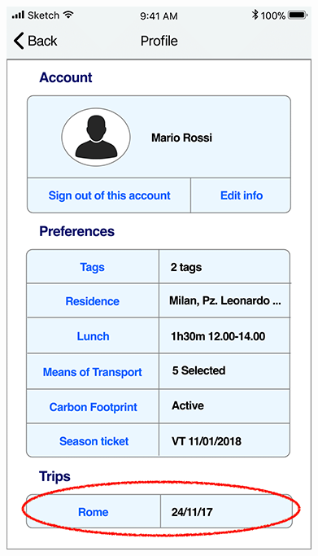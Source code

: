 \begin{figure}[H]
	\centering
	\includegraphics[scale=0.23]{Images/Interface/Trips/5_profile+trips}
	\hspace{0.5cm}

\end{figure}

